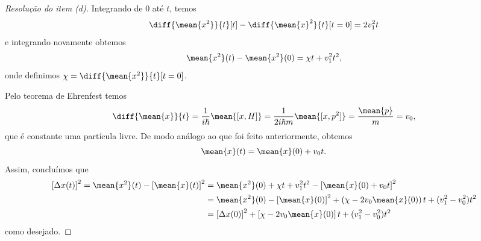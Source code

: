 \begin{proof}[Resolução do item (d)]
    Integrando de 0 até \(t\), temos
    \begin{equation*}
        \diff{\mean{x^2}}{t}[t] - \diff{\mean{x}^2}{t}[t=0] = 2v_1^2 t
    \end{equation*}
    e integrando novamente obtemos
    \begin{equation*}
        \mean{x^2}(t) - \mean{x^2}(0) = \chi t + v_1^2 t^2,
    \end{equation*}
    onde definimos \(\chi = \diff{\mean{x^2}}{t}[t=0]\).

    Pelo teorema de Ehrenfest temos
    \begin{equation*}
        \diff{\mean{x}}{t} = \frac{1}{i\hbar} \mean{[x, H]} = \frac{1}{2i\hbar m} \mean{[x,p^2]} = \frac{\mean{p}}{m} = v_0,
    \end{equation*}
    que é constante uma partícula livre. De modo análogo ao que foi feito anteriormente, obtemos
    \begin{equation*}
        \mean{x}(t) = \mean{x}(0) + v_0 t.
    \end{equation*}
    Assim, concluímos que
    \begin{align*}
        \left[\Delta x(t)\right]^2 = \mean{x^2}(t) - \left[\mean{x}(t)\right]^2
        &= \mean{x^2}(0) + \chi t + v_1^2 t^2 - \left[\mean{x}(0) + v_0 t\right]^2\\
        &= \mean{x^2}(0) - \left[\mean{x}(0)\right]^2 + \left(\chi - 2v_0 \mean{x}(0)\right)t + (v_1^2 - v_0^2)t^2\\
        &= \left[\Delta x(0)\right]^2 + \left[\chi - 2v_0 \mean{x}(0)\right]t + (v_1^2 - v_0^2)t^2
    \end{align*}
    como desejado.
\end{proof}
